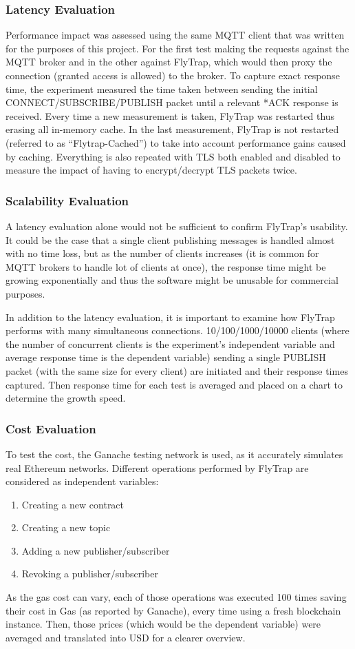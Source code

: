 \subsubsection{Latency Evaluation} Performance impact was assessed using the same MQTT client that was written for the purposes of this project. For the first test making the requests against the MQTT broker and in the other against FlyTrap, which would then proxy the connection (granted access is allowed) to the broker. To capture exact response time, the experiment measured the time taken between sending the initial CONNECT/SUBSCRIBE/PUBLISH packet until a relevant *ACK response is received. Every time a new measurement is taken, FlyTrap was restarted thus erasing all in-memory cache. In the last measurement, FlyTrap is not restarted (referred to as ``Flytrap-Cached'') to take into account performance gains caused by caching. Everything is also repeated with TLS both enabled and disabled to measure the impact of having to encrypt/decrypt TLS packets twice.
\subsubsection{Scalability Evaluation}
A latency evaluation alone would not be sufficient to confirm FlyTrap's usability. It could be the case that a single client publishing messages is handled almost with no time loss, but as the number of clients increases (it is common for MQTT brokers to handle lot of clients at once), the response time might be growing exponentially and thus the software might be unusable for commercial purposes. 

In addition to the latency evaluation, it is important to examine how FlyTrap performs with many simultaneous connections. 10/100/1000/10000 clients (where the number of concurrent clients is the experiment's independent variable and average response time is the dependent variable) sending a single PUBLISH packet (with the same size for every client) are initiated and their response times captured. Then response time for each test is averaged and placed on a chart to determine the growth speed.  
\subsubsection{Cost Evaluation}
To test the cost, the Ganache testing network is used, as it accurately simulates real Ethereum networks. Different operations performed by FlyTrap are considered as independent variables:
\begin{enumerate}
  \item Creating a new contract
  \item Creating a new topic
  \item Adding a new publisher/subscriber
  \item Revoking a publisher/subscriber
\end{enumerate}
As the gas cost can vary, each of those operations was executed 100 times saving their cost in Gas (as reported by Ganache), every time using a fresh blockchain instance. Then, those prices (which would be the dependent variable) were averaged and translated into USD for a clearer overview.
